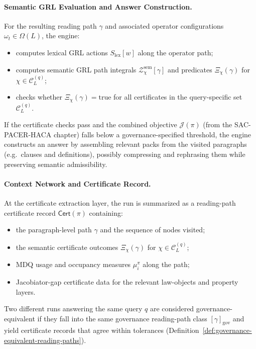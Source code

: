\documentclass[11pt]{book}
\theoremstyle{plain}
\theoremstyle{definition}
\theoremstyle{remark}
\begin{document}
\paragraph{Semantic GRL Evaluation and Answer Construction.}
For the resulting reading path $\gamma$ and associated operator
configurations $\omega_t\in\Omega(L)$, the engine:
\begin{itemize}
  \item computes lexical GRL actions $S_{\mathrm{lex}}[w]$ along the
        operator path;
  \item computes semantic GRL path integrals
        $\mathcal{Z}^{\mathrm{sem}}_\chi[\gamma]$ and predicates
        $\Xi_\chi(\gamma)$ for $\chi\in\mathcal{C}_L^{(q)}$;
  \item checks whether $\Xi_\chi(\gamma)=\mathrm{true}$ for all
        certificates in the query-specific set
        $\mathcal{C}_L^{(q)}$.
\end{itemize}
If the certificate checks pass and the combined objective
$\mathcal{J}(\pi)$ (from the SAC-PACER-HACA chapter) falls below a
governance-specified threshold, the engine constructs an answer by
assembling relevant packs from the visited paragraphs (e.g.\ clauses
and definitions), possibly compressing and rephrasing them while
preserving semantic admissibility.

\paragraph{Context Network and Certificate Record.}
At the certificate extraction layer, the run is summarized as a
reading-path certificate record $\mathsf{Cert}(\pi)$ containing:
\begin{itemize}
  \item the paragraph-level path $\gamma$ and the sequence of nodes
        visited;
  \item the semantic certificate outcomes
        $\Xi_\chi(\gamma)$ for $\chi\in\mathcal{C}_L^{(q)}$;
  \item MDQ usage and occupancy measures $\mu_i^\pi$ along the path;
  \item Jacobiator-gap certificate data for the relevant law-objects
        and property layers.
\end{itemize}
Two different runs answering the same query $q$ are considered
governance-equivalent if they fall into the same governance
reading-path class $[\gamma]_{\mathrm{gov}}$ and yield certificate
records that agree within tolerances
(Definition~\ref{def:governance-equivalent-reading-paths}).
\end{document}
